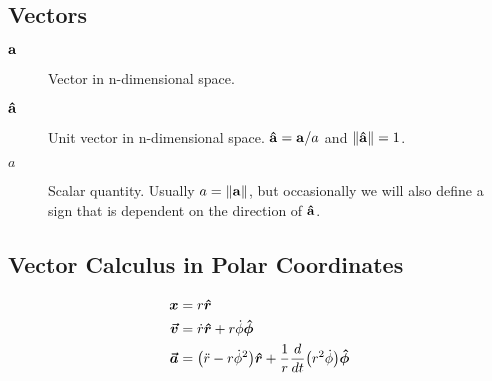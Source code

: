 \subsection{Vectors}

\begin{description}
  \item[$\mathbf{a}$] Vector in n-dimensional space.
  \item[$\mathbf{\hat{a}}$] Unit vector in n-dimensional space. $\mathbf{\hat{a}} = \mathbf{a}/a$ and $\norm{\bhat{a}} = 1$.
  \item[$a$] Scalar quantity. Usually $a = \norm{\bvec{a}}$, but occasionally we will also define a sign that is dependent on the direction of $\mathbf{\hat{a}}$.
\end{description}

\subsection{Vector Calculus in Polar Coordinates}

\begin{align*}
\boldsymbol{x}& = r \boldsymbol{\hat{r}}\\
\boldsymbol{\vec{v}}& = \dot{r} \boldsymbol{\hat{r}} + r \dot{\phi} \boldsymbol{\hat{\phi}}\\
\label{eq:a_vec_def}\boldsymbol{\vec{a}}& = \paren{\ddot{r} - r \dot{\phi}^2} \boldsymbol{\hat{r}} + \frac{1}{r} \frac{d}{dt} \paren{r^2 \dot{\phi}} \boldsymbol{\hat{\phi}}
\end{align*}
